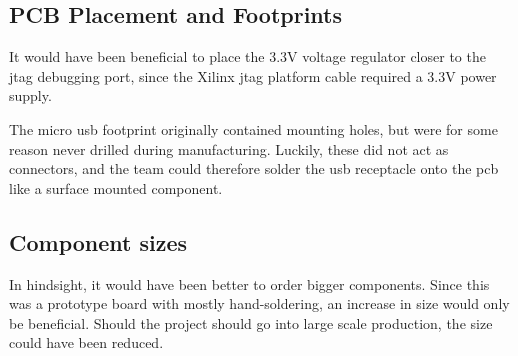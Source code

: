 \subsection{PCB Placement and Footprints}
It would have been beneficial to place the 3.3V voltage regulator closer to the \gls{jtag} debugging port, since the Xilinx \gls{jtag} platform cable required a 3.3V power supply.

The micro \gls{usb} footprint originally contained mounting holes, but were for some reason never drilled during manufacturing.
Luckily, these did not act as connectors, and the team could therefore solder the \gls{usb} receptacle onto the \gls{pcb} like a surface mounted component.

\subsection{Component sizes}
In hindsight, it would have been better to order bigger components.
Since this was a prototype board with mostly hand-soldering, an increase in size would only be beneficial.
Should the project should go into large scale production, the size could have been reduced.
